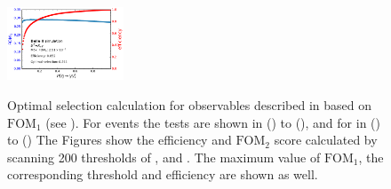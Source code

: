 \begin{figure}[hbtp!]
{            \includegraphics[width=0.31\textwidth]{figures/continuum_suppression/Bz_etaVeto_optimisation_sqrtsplusb.pdf}
        }
    \caption{\label{fig:selection_optimisations_sqrtsplusb} Optimal selection calculation for observables
    described in  based on $\mathrm{FOM}_1$ (see ).
    For \BptoXsgamma events the tests are shown
    in () to (),
    and for \BztoXsgamma in () to ()
    The Figures show the efficiency and $\mathrm{FOM}_2$ score calculated by scanning 200 thresholds of \piVeto, \etaVeto and \ZMVA.
    The maximum value of $\mathrm{FOM}_1$, the corresponding threshold and efficiency are shown as well.
    }
\end{figure}
